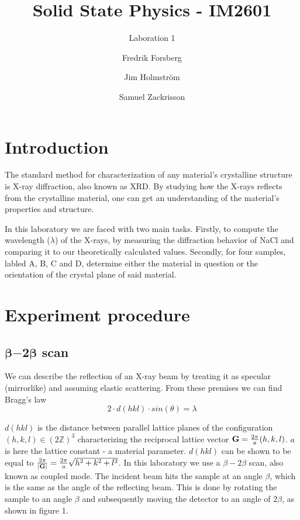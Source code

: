 \documentclass[a4paper,twoside=false,abstract=false,numbers=noenddot,
titlepage=false,headings=small,parskip=half,version=last]{scrartcl}
\title{Solid State Physics - IM2601}
\subtitle{Laboration 1}
\author[1]{Fredrik Forsberg}
\author[1]{Jim Holmström}
\author[1]{Samuel Zackrisson}
\affil[1]{Engineering Physics, Royal Institute of Technology}
\affil[1]{\{fforsber, jimho, samuelz\}@kth.se}
\begin{document}
\maketitle
\thispagestyle{empty}

\section{Introduction}
The standard method for characterization of any material's crystalline structure is X-ray diffraction, also known as XRD.
By studying how the X-rays reflects from the crystalline material, one can get an understanding of the material's properties and structure.

In this laboratory we are faced with two main tasks.
Firstly, to compute the wavelength ($\lambda$) of the X-rays, by measuring the diffraction behavior of NaCl and comparing it to our theoretically calculated values.
Secondly, for four samples, labled A, B, C and D, determine either the material in question or the orientation of the crystal plane of said material.

\section{Experiment procedure}
\subsection{$\boldsymbol{\beta}\boldsymbol{-}\boldsymbol{2}\boldsymbol{\beta}$ scan}
We can describe the reflection of an X-ray beam by treating it as specular (mirrorlike) and assuming elastic scattering. From these premises we can find Bragg's law
\begin{equation}
    \label{eq:braggs}
    2 \cdot d(hkl) \cdot sin( \theta ) = \lambda
\end{equation}

$d(hkl)$ is the distance between parallel lattice planes of the configuration $(h,k,l)\in \left(2 \mathbb{Z}\right)^3$
characterizing the reciprocal lattice vector $\bold{G}=\frac{2\pi}{a}(h,k,l)$. $a$ is here the lattice constant - a material parameter.
$d(hkl)$ can be shown to be equal to $\frac{2\pi}{\left\vert \bold{G} \right\vert} = \frac{2\pi}{a}\sqrt{h^2+k^2+l^2}$.
In this laboratory we use a $\beta-2\beta$ scan, also known as coupled mode.
The incident beam hits the sample at an angle $\beta$, which is the same as the angle of the reflecting beam.
This is done by rotating the sample to an angle $\beta$ and subsequently moving the detector to an angle of $2\beta$, as shown in figure 1.
\end{document}
